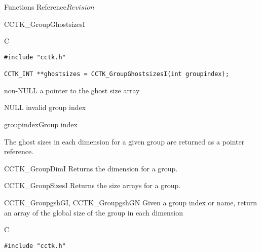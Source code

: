\begin{cactuspart}{ Functions Reference}{}{$Revision$}
\begin{FunctionDescription}{CCTK\_GroupGhostsizesI}
\begin{SynopsisSection}
\begin{Synopsis}{C}
\begin{verbatim}
#include "cctk.h"

CCTK_INT **ghostsizes = CCTK_GroupGhostsizesI(int groupindex);
\end{verbatim}
\end{Synopsis}
\end{SynopsisSection}

\begin{ResultSection}
\begin{Result}{non-NULL} a pointer to the ghost size array\end{Result}
\begin{Result}{NULL} invalid group index \end{Result}
\end{ResultSection}

\begin{ParameterSection}
\begin{Parameter}{groupindex}Group index\end{Parameter}
\end{ParameterSection}

\begin{Discussion}
The ghost sizes in each dimension for a given group are returned as a pointer reference.
\end{Discussion}

\begin{SeeAlsoSection}
\begin{SeeAlso}{CCTK\_GroupDimI}
Returns the dimension for a group.
\end{SeeAlso}
\begin{SeeAlso}{CCTK\_GroupSizesI}
Returns the size arrays for a group.
\end{SeeAlso}
\end{SeeAlsoSection}
\end{FunctionDescription}

\begin{FunctionDescription}{CCTK\_GroupgshGI, CCTK\_GroupgshGN}
\label{CCTK-GroupgshGI}
\label{CCTK-GroupgshGN}
Given a group index or name, return an array of the global size of the group in each dimension

\begin{SynopsisSection}
\begin{Synopsis}{C}
\begin{verbatim}
#include "cctk.h"


\end{verbatim}
\end{Synopsis}
\end{SynopsisSection}
\end{FunctionDescription}
\end{cactuspart}
